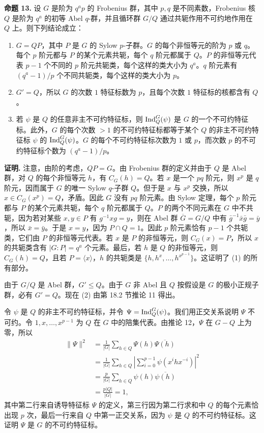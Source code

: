 \noindent\textbf{命题 13.} 设 $G$ 是阶为 $q^a p$ 的 Frobenius 群，其中 $p,q$ 是不同素数，Frobenius 核 $Q$ 是阶为 $q^a$ 的初等 Abel $q$-群，并且循环群 $G/Q$ 通过共轭作用不可约地作用在 $Q$ 上。则下列结论成立：
\begin{enumerate}[label=(\arabic*)]
  \item $G=QP$，其中 $P$ 是 $G$ 的 Sylow $p$-子群。$G$ 的每个非恒等元的阶为 $p$ 或 $q$。每个 $p$ 阶元都与 $P$ 的某个元素共轭，每个 $q$ 阶元都属于 $Q$。$P$ 的非恒等元代表 $p-1$ 个不同的 $p$ 阶元共轭类，每个这样的类大小为 $q^a$。$q$ 阶元素有 $(q^a-1)/p$ 个不同共轭类，每个这样的类大小为 $p$。
  \item $G'=Q$，所以 $G$ 的次数 $1$ 特征标数为 $p$，且每个次数 $1$ 特征标的核都含有 $Q$。
  \item 若 $\psi$ 是 $Q$ 的任意非主不可约特征标，则 $\operatorname{Ind}_Q^G(\psi)$ 是 $G$ 的一个不可约特征标。此外，$G$ 的每个次数 $>1$ 的不可约特征标都等于某个 $Q$ 的非主不可约特征标 $\psi$ 的 $\operatorname{Ind}_Q^G(\psi)$。$G$ 的每个不可约特征标次数为 $1$ 或 $p$，而次数 $p$ 的不可约特征标个数为 $(q^a-1)/p$。
\end{enumerate}

\noindent\textbf{证明.} 注意，由阶的考虑，$QP=G$。由 Frobenius 群的定义并由于 $Q$ 是 Abel 群，对 $Q$ 的每个非恒等元 $h$，有 $C_G(h)=Q$。若 $x$ 是一个 $pq$ 阶元，则 $x^p$ 是 $q$ 阶元，因而属于 $G$ 的唯一 Sylow $q$-子群 $Q$。但于是 $x$ 与 $x^p$ 交换，所以 $x\in C_G(x^p)=Q$，矛盾。因此 $G$ 没有 $pq$ 阶元素。由 Sylow 定理，每个 $p$ 阶元都与 $P$ 的某个元素共轭，每个 $q$ 阶元都属于 $Q$。$P$ 的两个不同元素在 $G$ 中不共轭，因为若对某些 $x,y\in P$ 有 $g^{-1}xg=y$，则在 Abel 群 $\overline G=G/Q$ 中有 $\bar g^{-1}\bar x\bar g=\bar y$，所以 $\bar x=\bar y$。于是 $x=y$，因为 $P\cap Q=1$。因此 $p$ 阶元素恰有 $p-1$ 个共轭类，它们由 $P$ 的非恒等元代表。若 $x$ 是 $P$ 的非恒等元，则 $C_G(x)=P$，所以 $x$ 的共轭类含有 $|G:P|=q^a$ 个元素。最后，若 $h$ 是 $Q$ 的非恒等元，则 $C_G(h)=Q$，且若 $P=\langle x\rangle$，$h$ 的共轭类是 $\{h,h^x,\ldots,h^{x^{p-1}}\}$。这证明了 (1) 的所有部分。

由于 $G/Q$ 是 Abel 群，$G'\leq Q$。由于 $G$ 非 Abel 且 $Q$ 按假设是 $G$ 的极小正规子群，必有 $G'=Q$。现在 (2) 由第 18.2 节推论 11 得出。

令 $\psi$ 是 $Q$ 的非主不可约特征标，并令 $\Psi=\operatorname{Ind}_Q^G(\psi)$。我们用正交关系说明 $\Psi$ 不可约。令 $1,x,\ldots,x^{p-1}$ 为 $Q$ 在 $G$ 中的陪集代表。由推论 12，$\Psi$ 在 $G-Q$ 上为零，所以
\[
\begin{aligned}
  \|\Psi\|^2
  &=\frac1{|G|}\sum_{h\in Q}\Psi(h)\overline{\Psi(h)}\\
  &=\frac1{|G|}\sum_{h\in Q}\left|\sum_{i=0}^{p-1}\psi(x^i h x^{-i})\right|^2\\
  &=\frac{p}{|G|}\sum_{h\in Q}\psi(h)\overline{\psi(h)}\\
  &=\frac{p|Q|}{|G|}=1,
\end{aligned}
\]
其中第二行来自诱导特征标 $\Psi$ 的定义，第三行因为第二行求和中 $Q$ 的每个元素恰出现 $p$ 次，最后一行来自 $Q$ 中第一正交关系，因为 $\psi$ 是 $Q$ 的不可约特征标。这证明 $\Psi$ 是 $G$ 的不可约特征标。

